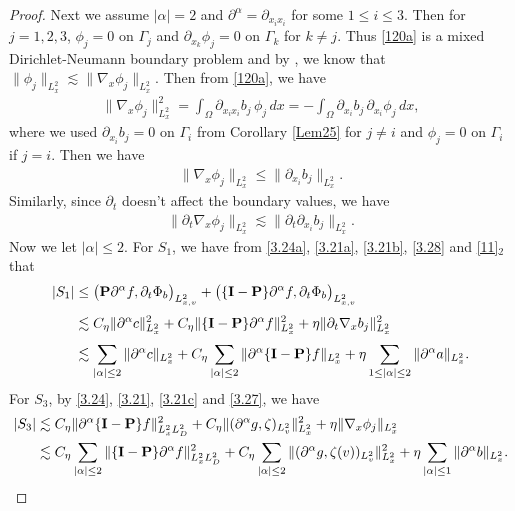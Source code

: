 \documentclass[reqno,a4paper]{amsart}
\numberwithin{equation}{section}
\newcommand{\1}{\mathbf{1}}
\renewcommand{\P}{\mathbf{P}}
\newcommand{\dis}{\displaystyle}
\newcommand{\pa}{\partial}
\newcommand{\na}{\nabla}
\newcommand{\<}{\langle}
\renewcommand{\>}{\rangle}
\newcommand{\I}{\mathbf{I}}
\renewcommand{\P}{\mathbf{P}}
\begin{document}
\begin{proof}
	Next we assume $|\alpha|=2$ and $\partial^\alpha = \partial_{x_ix_i}$ for some $1\le i\le 3$.
	Then for $j=1,2,3$, $\phi_j=0$ on $\Gamma_j$ and $\partial_{x_k}\phi_j=0$ on $\Gamma_k$ for $k\neq j$.
	Thus \eqref{120a} is a mixed Dirichlet-Neumann boundary problem and by \cite[Theorem 6.7-5]{Ciarlet2013}, we know that $\|\phi_j\|_{L^2_x}\lesssim \|\nabla_x\phi_j\|_{L^2_x}$. Then from \eqref{120a}, we have 
	\begin{align*}
		\|\na_x\phi_j\|_{L^2_x}^2= \int_\Omega\partial_{x_ix_i}b_j\,\phi_j\,dx
		=  - \int_\Omega\partial_{x_i}b_j\,\partial_{x_i}\phi_j\,dx,
	\end{align*}
	where we used $\pa_{x_i}b_j=0$ on $\Gamma_i$ from Corollary \eqref{Lem25} for $j\neq i$ and $\phi_j=0$ on $\Gamma_i$ if $j=i$. Then we have 
	\begin{align}\label{3.27}
		\|\na_x\phi_j\|_{L^2_x}\le \|\partial_{x_i}b_j\|_{L^2_x}. 
	\end{align}
	Similarly, since $\pa_t$ doesn't affect the boundary values, we have  
	\begin{align}\label{3.28}
		\|\partial_t\na_x\phi_j\|_{L^2_x}\lesssim\|\partial_t\partial_{x_i}b_j\|_{L^2_x}. 
	\end{align}
	Now we let $|\alpha|\le 2$. 
	For $S_1$, we have from \eqref{3.24a}, \eqref{3.21a}, \eqref{3.21b}, \eqref{3.28} and \eqref{11}$_2$ that 
	\begin{align}\label{4.31}\notag
		\dis|S_1| &\le  \big(\P \partial^\alpha f,\partial_t\Phi_b\big)_{L^2_{x,v}}+\big(\{\I-\P\} \partial^\alpha f,\partial_t\Phi_b\big)_{L^2_{x,v}}\\[1mm]
		&\notag\lesssim C_\eta\|\partial^\alpha c\|_{L^2_x}^2 + C_\eta\|\{\I-\P\} \partial^\alpha f\|_{L^2_x}^2 + \eta\|\partial_t\na_x b_j\|_{L^2_x}^2\\[1mm]
		&\lesssim  \sum_{|\alpha|\le 2}\|\partial^\alpha c\|_{L^2_x} +C_\eta\sum_{|\alpha|\le 2}\|\partial^\alpha \{\I-\P\}f\|_{L^2_x} +\eta\sum_{1\le|\alpha|\le2}\|\partial^\alpha a\|_{L^2_x}.
	\end{align}
For $S_3$, by \eqref{3.24}, \eqref{3.21}, \eqref{3.21c} and \eqref{3.27}, we have 
\begin{align}\label{3.22a}\notag
	|S_3|
	&\lesssim\notag C_\eta\|\partial^\alpha \{\I-\P\}f\|^2_{L^2_xL^2_D} +C_\eta\|(\partial^\alpha g,\zeta)_{L^2_v}\|^2_{L^2_x}+ \eta\|\nabla_x\phi_j\|_{L^2_x}\\
	&\lesssim C_\eta\sum_{|\alpha|\le 2}\|\{\I-\P\}\partial^\alpha f\|_{L^2_xL^2_D}^2 + C_\eta\sum_{|\alpha|\le 2}\|(\pa^\alpha g,\zeta(v))_{L^2_v}\|_{L^2_x}^2 + \eta\sum_{|\alpha|\le1}\|\partial^\alpha b\|_{L^2_x}.

\end{align}
\end{proof}
\end{document}
